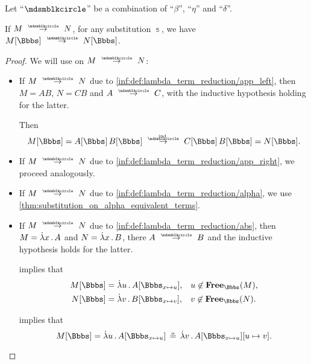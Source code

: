 \begin{proposition}\label{thm:substitution_on_single_step_reduction}
  Let \enquote{\( {\Anon} \)} be a combination of \enquote{\( \beta \)}, \enquote{\( \eta \)} and \enquote{\( \delta \)}.

  If \( M \pred N \), for any substitution \( \Bbbs \), we have \( M[\Bbbs] \pred N[\Bbbs] \).
\end{proposition}
\begin{proof}
  We will use  on \( M \pred N \):
  \begin{itemize}
    \item If \( M \pred N \) due to \ref{inf:def:lambda_term_reduction/app_left}, then \( M = AB \), \( N = CB \) and \( A \pred C \), with the inductive hypothesis holding for the latter.

    Then
    \begin{equation*}
      M[\Bbbs]
      =
      A[\Bbbs] \thinspace B[\Bbbs]
      \reloset{\T{ind.}} \pred
      C[\Bbbs] \thinspace B[\Bbbs]
      =
      N[\Bbbs].
    \end{equation*}

    \item If \( M \pred N \) due to \ref{inf:def:lambda_term_reduction/app_right}, we proceed analogously.

    \item If \( M \pred N \) due to \ref{inf:def:lambda_term_reduction/alpha}, we use \cref{thm:substitution_on_alpha_equivalent_terms}.

    \item If \( M \pred N \) due to \ref{inf:def:lambda_term_reduction/abs}, then \( M = \qabs x A \) and \( N = \qabs x B \), there \( A \pred B \) and the inductive hypothesis holds for the latter.

     implies that
    \begin{align*}
      M[\Bbbs] &= \qabs u A[\Bbbs_{x \mapsto u}], &&u \not\in \op*{Free}_\Bbbs(M), \\
      N[\Bbbs] &= \qabs v B[\Bbbs_{x \mapsto v}], &&v \not\in \op*{Free}_\Bbbs(N).
    \end{align*}

     implies that
    \begin{equation*}
      M[\Bbbs] = \qabs u A[\Bbbs_{x \mapsto u}] \aequiv \qabs v A[\Bbbs_{x \mapsto u}][u \mapsto v].
    \end{equation*}


\end{itemize}
\end{proof}
